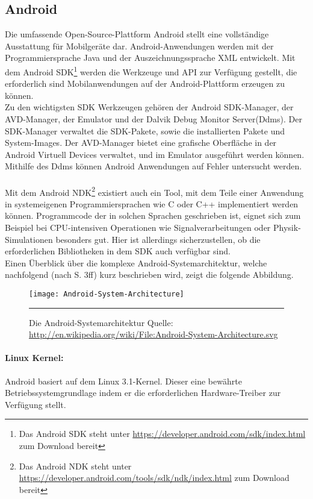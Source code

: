 \subsection{Android}
Die umfassende Open-Source-Plattform Android stellt eine vollständige Ausstattung für Mobilgeräte dar. Android-Anwendungen werden mit der Programmiersprache Java und der Auszeichnungssprache \gls{XML} entwickelt. Mit dem Android \gls{SDK}\footnote{ Das Android \gls{SDK} steht unter \url{https://developer.android.com/sdk/index.html} zum Download bereit} werden die Werkzeuge und \gls{API} zur Verfügung gestellt, die erforderlich sind Mobilanwendungen auf der Android-Plattform erzeugen zu können.\\ 
Zu den wichtigsten \gls{SDK} Werkzeugen gehören der Android \gls{SDK}-Manager, der AVD-Manager, der Emulator und der Dalvik Debug Monitor Server(Ddms). Der \gls{SDK}-Manager verwaltet die \gls{SDK}-Pakete, sowie die installierten Pakete und System-Images. Der AVD-Manager bietet eine grafische Oberfläche in der Android Virtuell Devices verwaltet, und im Emulator ausgeführt werden können. Mithilfe des Ddms können Android Anwendungen auf Fehler untersucht werden. \cite{android_sdk} \\\\
Mit dem Android \gls{NDK}\footnote{ Das Android \gls{NDK} steht unter \url{https://developer.android.com/tools/sdk/ndk/index.html} zum Download bereit} existiert auch ein Tool, mit dem Teile einer Anwendung in systemeigenen Programmiersprachen wie C oder C++ implementiert werden können. Programmcode der in solchen Sprachen geschrieben ist, eignet sich zum Beispiel bei CPU-intensiven Operationen wie Signalverarbeitungen oder Physik-Simulationen besonders gut. Hier ist allerdings sicherzustellen, ob die erforderlichen Bibliotheken in dem \gls{SDK} auch verfügbar sind. \cite{android_ndk} \\
Einen Überblick über die komplexe Android-Systemarchitektur, welche nachfolgend (nach \cite{android} S. 3ff) kurz beschrieben wird, zeigt die folgende Abbildung.
\begin{figure}[H]  
    \centering  
    \texttt{[image: Android-System-Architecture]} 
    \rule{35em}{0.5pt}
    \caption[Android-Systemarchitektur]{Die Android-Systemarchitektur Quelle: \url{http://en.wikipedia.org/wiki/File:Android-System-Architecture.svg}}
    \label{fig:android}
\end{figure}
\paragraph{Linux Kernel: }
Android basiert auf dem Linux 3.1-Kernel. Dieser eine bewährte Betriebssystemgrundlage indem er die erforderlichen Hardware-Treiber zur Verfügung stellt.
